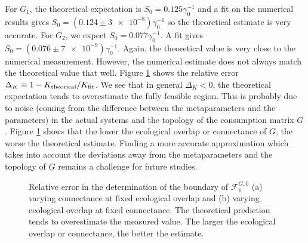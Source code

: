 \documentclass[12pt, titlepage]{report}
\begin{document}
 For $G_1$, the theoretical expectation is $S_0 = 0.125 \gamma_0^{-1}$ and a fit on the numerical results gives $S_0=(\num[scientific-notation=false]{0.124}\pm\num{3e-8}) \gamma_0^{-1}$ so the theoretical estimate is very accurate.
For $G_2$, we expect $S_0 = 0.077 \gamma_0^{-1}$. A fit gives $S_0=(\num[scientific-notation=false]{0.076}\pm\num{7e-9})\gamma_0^{-1}$. Again, the theoretical value is very close to the numerical measurement.
However, the numerical estimate does not always match the theoretical value that well. Figure \ref{fig: deviation away from theory feasibility} shows the relative error $\Delta_K \equiv 1 - K_\text{theorical}/K_\text{fit}$. We see that in general $\Delta_K < 0$, \ie the theoretical expectation tends to overestimate the fully feasible region. This is probably due to noise (\ie coming from the difference between the metaparameters and the parameters) in the actual systems and the topology of the consumption matrix $G$. Figure \ref{fig: deviation away from theory feasibility} shows that the lower the ecological overlap or connectance of $G$, the worse the theoretical estimate. Finding a more accurate approximation which takes into account the deviations away from the metaparameters and the topology of $G$ remains a challenge for future studies.

\begin{figure}[h!]
	\captionsetup[subfigure]{captionskip = -175pt, margin = 45pt}
\captionsetup[subfigure]{captionskip = -175pt, margin = 45pt}
\caption{Relative error in the determination of the boundary of $\mathcal{F}^{G,0}_1$ (a) varying connectance at fixed ecological overlap and (b) varying ecological overlap at fixed connectance. The theoretical prediction tends to overestimate the measured value. The larger the ecological overlap or connectance, the better the estimate.}\label{fig: deviation away from theory feasibility}
\end{figure}
\end{document}

